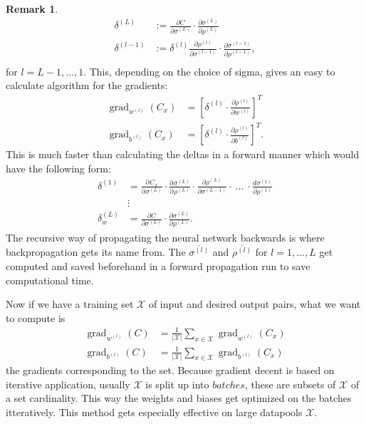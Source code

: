 \documentclass{article}
\theoremstyle{definition}
\newtheorem{remark}[theorem]{Remark}
\DeclareMathOperator{\grad}{grad}
\begin{document}
\begin{remark}
\begin{align*}
\delta^{(L)} &:= \frac{\partial C}{\partial \sigma^{(L)}} \cdot \frac{\partial \sigma^{(L)}}{\partial \rho^{(L)}} \\
\delta^{(l-1)} &:= \delta^{(l)} \frac{\partial \rho^{(l)}}{\partial \sigma^{(l-1)}} \cdot \frac{\partial \sigma^{(l-1)}}{\partial \rho^{(l-1)}}, \\
\end{align*}
for $l=L-1, \dots, 1$.
This, depending on the choice of sigma, gives an easy to calculate algorithm for the gradients:
\begin{align*}
\grad_{w^{(l)}}(C_x) &= \left[\delta^{(l)} \cdot \frac{\partial \rho^{(l)}}{\partial w^{(l)}}\right]^{T} \\
\grad_{b^{(l)}}(C_x) &= \left[\delta^{(l)} \cdot \frac{\partial \rho^{(l)}}{\partial b^{(l)}}\right]^{T}.
\end{align*}
This is much faster than calculating the deltas in a forward manner which would have the following form:
\begin{align*}
\delta^{(1)} &= \frac{\mathrm \partial C_{x}}{\mathrm \partial \sigma^{(L)}} \cdot \frac{\mathrm \partial \sigma^{(L)}}{\mathrm \partial \rho^{(L)}} \cdot \frac{\partial \rho^{(L)}}{\partial \sigma^{(L-1)}} \cdot \ \ldots \ \cdot \frac{d \sigma^{(1)}}{\partial \rho^{(1)}} \\
&\vdots \\
\delta^{(L)}_{w} &= \frac{\partial C}{\partial \sigma^{(L)}} \cdot \frac{\partial \sigma^{(L)}}{\partial \rho^{(L)}}.
\end{align*}
The recursive way of propagating the neural network backwards is where backpropagation gets its name from. The $\overline{\sigma^{(l)}}$ and $\overline{\rho^{(l)}}$ for $l = 1, \dots , L$ get computed and saved beforehand in a forward propagation run to save computational time.

Now if we have a training set $\mathcal{X}$ of input and desired output pairs, what we want to compute is
\begin{align*}
\grad_{w^{(l)}}(C) &= \frac{1}{|\mathcal{X}|}\sum_{x \in \mathcal{X}}\grad_{w^{(l)}}(C_x) \\
\grad_{b^{(l)}}(C) &= \frac{1}{|\mathcal{X}|}\sum_{x \in \mathcal{X}}\grad_{b^{(l)}}(C_x)
\end{align*}
the gradients corresponding to the set. Because gradient decent is based on iterative application, usually $\mathcal{X}$ is split up into $batches$, these are subsets of $\mathcal{X}$ of a set cardinality. This way the weights and biases get optimized on the batches itteratively. This method gets especially effective on large datapools $\mathcal{X}$.
\end{remark}
\end{document}
